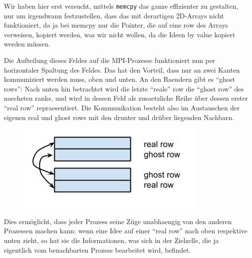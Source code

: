\begin{Shaded}
\begin{Highlighting}[]
          \NormalTok{\});                              \textbackslash{}}
    \NormalTok{\});}
\end{Highlighting}
\end{Shaded}

Wir haben hier erst versucht, mittels \texttt{memcpy} das ganze
effizienter zu gestalten, nur um irgendwann festzustellen, dass das mit
derartigen 2D-Arrays nicht funktioniert, da ja bei memcpy nur die
Pointer, die auf eine row des Arrays verweisen, kopiert werden, was wir
nicht wollen, da die Ideen by value kopiert werden müssen.

Die Aufteilung dieses Feldes auf die MPI-Prozesse funktioniert nun per
horizontaler Spaltung des Feldes. Das hat den Vorteil, dass nur an zwei
Kanten kommuniziert werden muss, oben und unten. An den Raendern gibt es
``ghost rows'': Nach unten hin betrachtet wird die letzte ``reale'' row
die ``ghost row'' des naechsten ranks, und wird in dessen Feld als
zusaetzliche Reihe über dessen erster ``real row'' repraesentiert. Die
Kommunikation besteht also im Austauschen der eigenen real und ghost
rows mit den drunter und drüber liegenden Nachbarn.

\begin{figure}[htbp]
\centering
\includegraphics{pics/real-ghost-rows.jpg}
\end{figure}

Dies ermöglicht, dass jeder Prozess seine Züge unabhaengig von den
anderen Prozessen machen kann: wenn eine Idee auf einer ``real row''
nach oben respektive unten zieht, so hat sie die Informationen, was sich
in der Zielzelle, die ja eigentlich vom benachbarten Prozess bearbeitet
wird, befindet.

